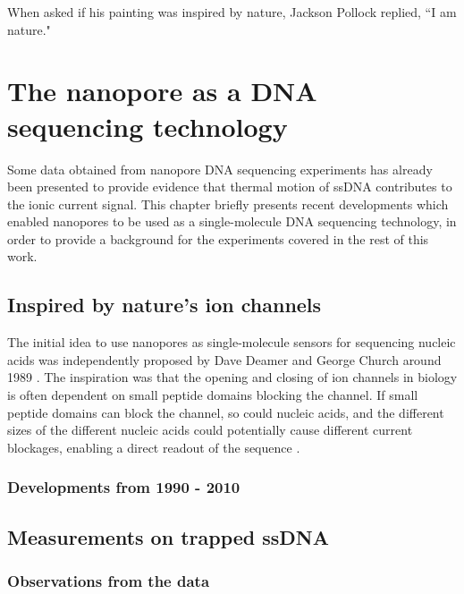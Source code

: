 \begin{savequote}[75mm]
When asked if his painting was inspired by nature, Jackson Pollock replied, ``I am nature."
\end{savequote}

\chapter{The nanopore as a DNA sequencing technology}
\label{dna_sequencing}

Some data obtained from nanopore DNA sequencing experiments has already been presented to provide evidence that thermal motion of ssDNA contributes to the ionic current signal.  This chapter briefly presents recent developments which enabled nanopores to be used as a single-molecule DNA sequencing technology, in order to provide a background for the experiments covered in the rest of this work.

\section{Inspired by nature's ion channels}

The initial idea to use nanopores as single-molecule sensors for sequencing nucleic acids was independently proposed by Dave Deamer and George Church around 1989 \citep{Deamer2016,Branton2008}.  The inspiration was that the opening and closing of ion channels in biology is often dependent on small peptide domains blocking the channel.  If small peptide domains can block the channel, so could nucleic acids, and the different sizes of the different nucleic acids could potentially cause different current blockages, enabling a direct readout of the sequence \citep{Branton2008}.

\subsection{Developments from 1990 - 2010}



\section{Measurements on trapped ssDNA}



\subsection{Observations from the data}



